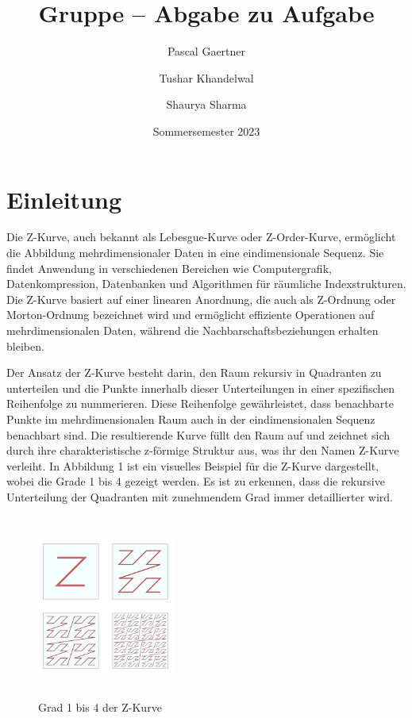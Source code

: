\documentclass[course=erap]{aspdoc}
\author{Pascal Gaertner\and Tushar Khandelwal\and Shaurya Sharma}
\date{Sommersemester 2023}
\title{Gruppe \theGroup{} -- Abgabe zu Aufgabe \theNumber}
\begin{document}
\maketitle

\section{Einleitung}

\setlength{\parskip}{1em}
\noindent Die Z-Kurve, auch bekannt als Lebesgue-Kurve oder Z-Order-Kurve, ermöglicht die Abbildung mehrdimensionaler Daten in eine eindimensionale Sequenz. Sie findet Anwendung in verschiedenen Bereichen wie Computergrafik, Datenkompression, Datenbanken und Algorithmen für räumliche Indexstrukturen. Die Z-Kurve basiert auf einer linearen Anordnung, die auch als Z-Ordnung oder Morton-Ordnung bezeichnet wird und ermöglicht effiziente Operationen auf mehrdimensionalen Daten, während die Nachbarschaftsbeziehungen erhalten bleiben.
\setlength{\parskip}{1em}

\noindent Der Ansatz der Z-Kurve besteht darin, den Raum rekursiv in Quadranten zu unterteilen und die Punkte innerhalb dieser Unterteilungen in einer spezifischen Reihenfolge zu nummerieren. Diese Reihenfolge gewährleistet, dass benachbarte Punkte im mehrdimensionalen Raum auch in der eindimensionalen Sequenz benachbart sind. Die resultierende Kurve füllt den Raum auf und zeichnet sich durch ihre charakteristische z-förmige Struktur aus, was ihr den Namen Z-Kurve verleiht. In Abbildung 1 ist ein visuelles Beispiel für die Z-Kurve dargestellt, wobei die Grade 1 bis 4 gezeigt werden. Es ist zu erkennen, dass die rekursive Unterteilung der Quadranten mit zunehmendem Grad immer detaillierter wird.
\setlength{\parskip}{1em}

\begin{figure}[H]
        \centering
        \includegraphics[width=0.4\textwidth, height=6cm]{z_kurve_grad_1_zu_4.png}
        \caption{Grad 1 bis 4 der Z-Kurve}
        \label{fig:Z-Kurve Grad 1 zu 4}
    \end{figure}
\end{document}
